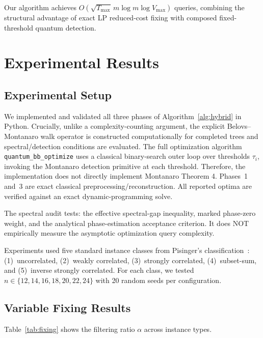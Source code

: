 \documentclass[conference]{IEEEtran} \IEEEoverridecommandlockouts
\begin{document}
Our algorithm achieves $O\!\left(\sqrt{T_{\max}}\,m\log m\log V_{\max}\right)$ queries, combining the structural advantage of exact LP reduced-cost fixing with composed fixed-threshold quantum detection.




\section{Experimental Results} \label{sec:experiments}

\subsection{Experimental Setup}
We implemented and validated all three phases of Algorithm~\ref{alg:hybrid} in Python. Crucially, unlike a complexity-counting argument, the explicit Belovs--Montanaro walk operator is constructed computationally for completed trees and spectral/detection conditions are evaluated. The full optimization algorithm \texttt{quantum\_bb\_optimize} uses a classical binary-search outer loop over thresholds $\tau_i$, invoking the Montanaro detection primitive at each threshold. Therefore, the implementation does not directly implement Montanaro Theorem 4. Phases~1 and~3 are exact classical preprocessing/reconstruction. All reported optima are verified against an exact dynamic-programming solve.

The spectral audit tests: the effective spectral-gap inequality, marked phase-zero weight, and the analytical phase-estimation acceptance criterion. It does NOT empirically measure the asymptotic optimization query complexity.

Experiments used five standard instance classes from Pisinger's classification~\cite{ref3}: (1)~uncorrelated, (2)~weakly correlated, (3)~strongly correlated, (4)~subset-sum, and (5)~inverse strongly correlated. For each class, we tested $n \in \{12, 14, 16, 18, 20, 22, 24\}$ with 20 random seeds per configuration.

\subsection{Variable Fixing Results}
Table~\ref{tab:fixing} shows the filtering ratio $\alpha$ across instance types.
\end{document}
